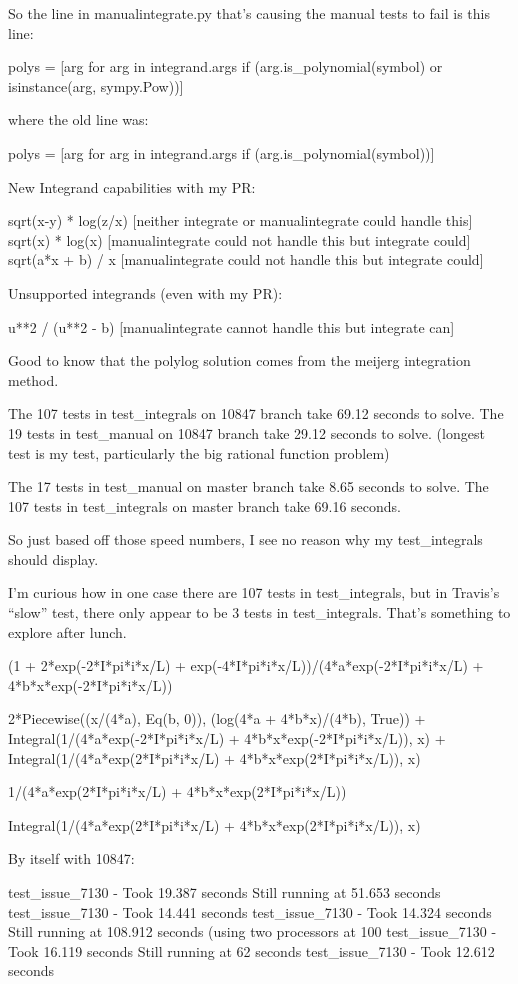 So the line in manualintegrate.py that's causing the manual tests to fail is this line:

        polys = [arg for arg in integrand.args if (arg.is_polynomial(symbol) or isinstance(arg, sympy.Pow))]

where the old line was:

polys = [arg for arg in integrand.args if (arg.is_polynomial(symbol))]

New Integrand capabilities with my PR:

sqrt(x-y) * log(z/x) [neither integrate or manualintegrate could handle this]
sqrt(x) * log(x) [manualintegrate could not handle this but integrate could]
sqrt(a*x + b) / x [manualintegrate could not handle this but integrate could]

Unsupported integrands (even with my PR):

u**2 / (u**2 - b) [manualintegrate cannot handle this but integrate can]

Good to know that the polylog solution comes from the meijerg integration method.

The 107 tests in test_integrals on 10847 branch take 69.12 seconds to solve.
The 19 tests in test_manual on 10847 branch take 29.12 seconds to solve. (longest test is my test, particularly the big rational function problem)

The 17 tests in test_manual on master branch take 8.65 seconds to solve.
The 107 tests in test_integrals on master branch take 69.16 seconds.

So just based off those speed numbers, I see no reason why my test_integrals should display.

I'm curious how in one case there are 107 tests in test_integrals, but in Travis's ``slow'' test, there only appear to be 3 tests in test_integrals. That's something to explore after lunch.

(1 + 2*exp(-2*I*pi*i*x/L) + exp(-4*I*pi*i*x/L))/(4*a*exp(-2*I*pi*i*x/L) + 4*b*x*exp(-2*I*pi*i*x/L))

2*Piecewise((x/(4*a), Eq(b, 0)), (log(4*a + 4*b*x)/(4*b), True)) + Integral(1/(4*a*exp(-2*I*pi*i*x/L) + 4*b*x*exp(-2*I*pi*i*x/L)), x) + Integral(1/(4*a*exp(2*I*pi*i*x/L) + 4*b*x*exp(2*I*pi*i*x/L)), x)

1/(4*a*exp(2*I*pi*i*x/L) + 4*b*x*exp(2*I*pi*i*x/L))

Integral(1/(4*a*exp(2*I*pi*i*x/L) + 4*b*x*exp(2*I*pi*i*x/L)), x)

By itself with 10847:

test_issue_7130 - Took 19.387 seconds
Still running at 51.653 seconds
test_issue_7130 - Took 14.441 seconds
test_issue_7130 - Took 14.324 seconds
Still running at 108.912 seconds (using two processors at 100%
test_issue_7130 - Took 16.119 seconds
Still running at 62 seconds
test_issue_7130 - Took 12.612 seconds

